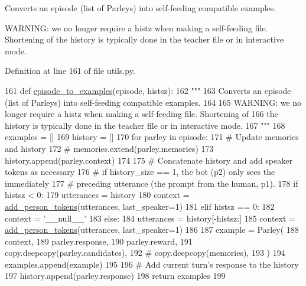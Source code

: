 \begin{DoxyVerb}Converts an episode (list of Parleys) into self-feeding compatible examples.

WARNING: we no longer require a histz when making a self-feeding file. Shortening of
the history is typically done in the teacher file or in interactive mode.
\end{DoxyVerb}
 

Definition at line 161 of file utils.\+py.


\begin{DoxyCode}
161 \textcolor{keyword}{def }\hyperlink{namespaceprojects_1_1self__feeding_1_1utils_a4523d4a7c4da698dda134e32acebe320}{episode\_to\_examples}(episode, histsz):
162     \textcolor{stringliteral}{"""}
163 \textcolor{stringliteral}{    Converts an episode (list of Parleys) into self-feeding compatible examples.}
164 \textcolor{stringliteral}{}
165 \textcolor{stringliteral}{    WARNING: we no longer require a histz when making a self-feeding file. Shortening of}
166 \textcolor{stringliteral}{    the history is typically done in the teacher file or in interactive mode.}
167 \textcolor{stringliteral}{    """}
168     examples = []
169     history = []
170     \textcolor{keywordflow}{for} parley \textcolor{keywordflow}{in} episode:
171         \textcolor{comment}{# Update memories and history}
172         \textcolor{comment}{# memories.extend(parley.memories)}
173         history.append(parley.context)
174 
175         \textcolor{comment}{# Concatenate history and add speaker tokens as necessary}
176         \textcolor{comment}{# if history\_size == 1, the bot (p2) only sees the immediately}
177         \textcolor{comment}{# preceding utterance (the prompt from the human, p1).}
178         \textcolor{keywordflow}{if} histsz < 0:
179             utterances = history
180             context = \hyperlink{namespaceprojects_1_1self__feeding_1_1utils_a3f3d055dc6c4058057baae7b240de5ec}{add\_person\_tokens}(utterances, last\_speaker=1)
181         \textcolor{keywordflow}{elif} histsz == 0:
182             context = \textcolor{stringliteral}{'\_\_null\_\_'}
183         \textcolor{keywordflow}{else}:
184             utterances = history[-histsz:]
185             context = \hyperlink{namespaceprojects_1_1self__feeding_1_1utils_a3f3d055dc6c4058057baae7b240de5ec}{add\_person\_tokens}(utterances, last\_speaker=1)
186 
187         example = Parley(
188             context,
189             parley.response,
190             parley.reward,
191             copy.deepcopy(parley.candidates),
192             \textcolor{comment}{# copy.deepcopy(memories),}
193         )
194         examples.append(example)
195 
196         \textcolor{comment}{# Add current turn's response to the history}
197         history.append(parley.response)
198     \textcolor{keywordflow}{return} examples
199 \end{DoxyCode}
